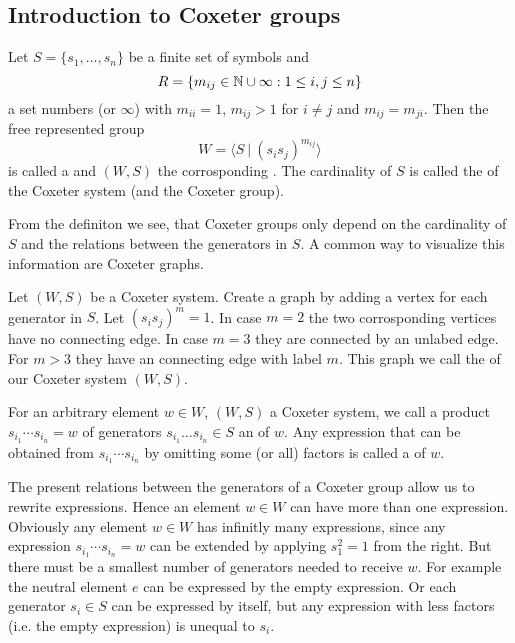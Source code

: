 \subsection{Introduction to Coxeter groups}
\label{sec:coxeter-groups-introduction}

\begin{defi}
	Let $S = \{ s_1, \ldots, s_n \}$ be a finite set of symbols and
	$$R = \{ m_{ij} \in \mathbb{N} \cup \infty : 1 \leq i,j \leq n \}$$
	a set numbers (or $\infty$) with $m_{ii} = 1$, $m_{ij} > 1$ for $i \neq j$ and $m_{ij} = m_{ji}$. Then the free represented group
	$$W = \langle S \ | \ (s_i s_j)^{m_{ij}} \rangle$$
	is called a  and $(W,S)$ the corrosponding . The cardinality of $S$ is called the  of the Coxeter system (and the Coxeter group).
\end{defi}

From the definiton we see, that Coxeter groups only depend on the cardinality of $S$ and the relations between the generators in $S$. A common way to visualize this information are Coxeter graphs.

\begin{defi}
	Let $(W,S)$ be a Coxeter system. Create a graph by adding a vertex for each generator in $S$. Let $(s_i s_j)^m = 1$. In case $m = 2$ the two corrosponding vertices have no connecting edge. In case $m = 3$ they are connected by an unlabed edge. For $m > 3$ they have an connecting edge with label $m$. This graph we call the  of our Coxeter system $(W,S)$.
\end{defi}

\begin{defi}
	For an arbitrary element $w \in W$, $(W,S)$ a Coxeter system, we call a product $s_{i_1} \cdots s_{i_n} = w$ of generators $s_{i_1} \ldots s_{i_n} \in S$ an  of $w$. Any expression that can be obtained from $s_{i_1} \cdots s_{i_n}$ by omitting some (or all) factors is called a  of $w$.
\end{defi}

The present relations between the generators of a Coxeter group allow us to rewrite expressions. Hence an element $w \in W$ can have more than one expression. Obviously any element $w \in W$ has infinitly many expressions, since any expression $s_{i_1} \cdots s_{i_n} = w$ can be extended by applying $s_1^2 = 1$ from the right. But there must be a smallest number of generators needed to receive $w$. For example the neutral element $e$ can be expressed by the empty expression. Or each generator $s_i \in S$ can be expressed by itself, but any expression with less factors (i.e. the empty expression) is unequal to $s_i$.

